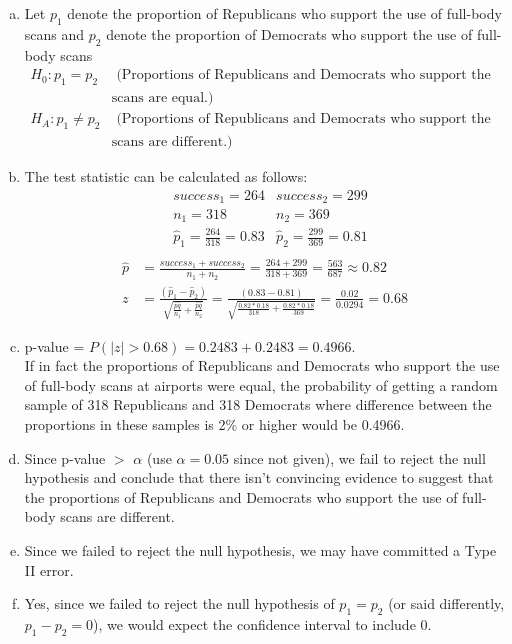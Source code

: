 {{\begin{enumerate}[(a)]
\item Let $p_1$ denote the proportion of Republicans who support the use of full-body scans and $p_2$ denote the proportion of Democrats who support the use of full-body scans
\begin{align*}
H_0: p_1 = p_2 &\text{ (Proportions of Republicans and Democrats who support the use of full-body} \\
&\text{scans are equal.)} \\
H_A: p _1 \ne p_2 &\text{ (Proportions of Republicans and Democrats who support the use of full-body} \\
&\text{scans are different.)}
\end{align*}
\item The test statistic can be calculated as follows:
\begin{align*}
&success_1 = 264				&success_2 = 299 \\
&n_1 = 318					&n_2 = 369 \\
&\hat{p}_1 = \frac{264}{318} = 0.83	&\hat{p}_2 = \frac{299}{369} = 0.81 \\
\end{align*}
\begin{align*}
\hat{p} &= \frac{success_1 + success_2}{n_1 + n_2} = \frac{264 + 299}{318 + 369} = \frac{563}{687} \approx 0.82 \\
z &= \frac{(\hat{p}_1 - \hat{p}_2)}{\sqrt{\frac{\hat{p} \hat{q}}{n_1} + \frac{\hat{p} \hat{q}}{n_2}}} = \frac{(0.83 - 0.81)}{\sqrt{\frac{0.82 * 0.18}{318} + \frac{0.82 * 0.18}{369}}} = \frac{0.02}{0.0294} = 0.68
\end{align*}
\item p-value = $P(|z| > 0.68) = 0.2483 + 0.2483 = 0.4966 $. 
$\:$ \\
If in fact the proportions of Republicans and Democrats who support the use of full-body scans at airports were equal, the probability of getting a random sample of 318 Republicans and 318 Democrats where difference between the proportions in these samples is 2\% or higher would be 0.4966.
\item Since p-value $>$ $\alpha$ (use $\alpha = 0.05$ since not given), we fail to reject the null hypothesis and conclude that there isn't convincing evidence to suggest that the proportions of Republicans and Democrats who support the use of full-body scans are different.
\item Since we failed to reject the null hypothesis, we may have committed a Type II error.
\item Yes, since we failed to reject the null hypothesis of $p_1 = p_2$ (or said differently, $p_1 - p_2 = 0$), we would expect the confidence interval to include 0.
\end{enumerate}
}\label{fullBodyScan}
}

